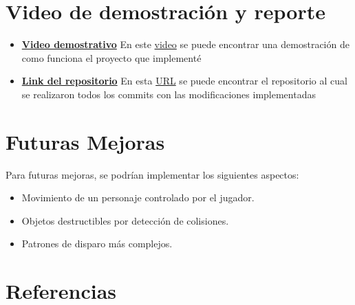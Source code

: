 \documentclass[11pt]{article}
\begin{document}
  \section*{Video de demostración y reporte}
  \begin{itemize}
    \item \href{https://youtu.be/X57H45DqY2A}{\textbf{Video demostrativo}}
      En este \href{https://youtu.be/X57H45DqY2A}{video} se puede encontrar una demostración de como funciona el proyecto que implementé
    \item \href{https://github.com/alearredondo09/Medieval_Hell_Shooter?tab=readme-ov-file#assets}{\textbf{Link del repositorio}}
      En esta \href{https://github.com/alearredondo09/Medieval_Hell_Shooter?tab=readme-ov-file#assets}{URL} se puede encontrar el repositorio al cual se realizaron todos los commits con las modificaciones implementadas
  \end{itemize}

  \section*{Futuras Mejoras}

  Para futuras mejoras, se podrían implementar los siguientes aspectos: 
  \begin{itemize}
    \item Movimiento de un personaje controlado por el jugador.
    \item Objetos destructibles por detección de colisiones.
    \item Patrones de disparo más complejos.
  \end{itemize}

  \section*{Referencias}
\end{document}
